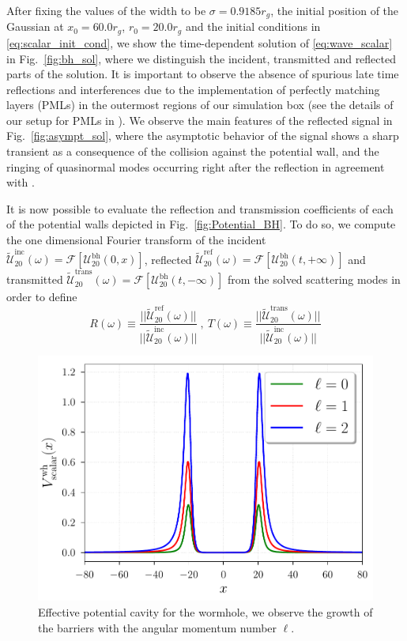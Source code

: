 \documentclass[article,aps,nofootinbib,twocolumn,superscriptaddress]{revtex4-1}
\begin{document}
After fixing the values of the width to be $\sigma=0.9185r_g$, the initial position of the Gaussian at $x_0=60.0r_g$, $r_0=20.0r_g$ and the initial conditions in \eqref{eq:scalar_init_cond}, we show the time-dependent solution of \eqref{eq:wave_scalar} in Fig.~\ref{fig:bh_sol}, where we distinguish the incident, transmitted and reflected parts of the solution. It is important to observe the absence of spurious late time reflections and interferences due to the implementation of perfectly matching layers (PMLs) in the outermost regions of our simulation box (see the details of our setup for PMLs in \citep{Frolov:2017asg}). We observe the main features of the reflected signal in Fig.~\ref{fig:asympt_sol}, where the asymptotic behavior of the signal shows a sharp transient as a consequence of the collision against the potential wall, and the ringing of quasinormal modes occurring right after the reflection in agreement with \citep{Petrich:1985csm}. 

It is now possible to evaluate the reflection and transmission coefficients of each of the potential walls depicted in Fig.~\ref{fig:Potential_BH}. To do so, we compute the one dimensional Fourier transform of the incident $\tilde{\mathcal{U}}_{20}^{\mathrm{inc}}(\omega)=\mathcal{F}[\mathcal{U}^{\mathrm{bh}}_{20}(0,x)]$, reflected $\tilde{\mathcal{U}}_{20}^{\mathrm{ref}}(\omega)=\mathcal{F}[\mathcal{U}^{\mathrm{bh}}_{20}(t,+\infty)]$ and transmitted $\tilde{\mathcal{U}}_{20}^{\mathrm{trans}}(\omega)=\mathcal{F}[\mathcal{U}^{\mathrm{bh}}_{20}(t,-\infty)]$ from the solved scattering modes in order to define
\begin{equation}
R(\omega)\equiv \frac{||\tilde{\mathcal{U}}_{20}^{\mathrm{ref}}(\omega)||}{||\tilde{\mathcal{U}}_{20}^{\mathrm{inc}}(\omega)||}~,~T(\omega)\equiv \frac{||\tilde{\mathcal{U}}_{20}^{\mathrm{trans}}(\omega)||}{||\tilde{\mathcal{U}}_{20}^{\mathrm{inc}}(\omega)||}
\label{eq:ref_and_trans}
\end{equation}
\begin{figure}[t]
\centering
\includegraphics[width=.4\textwidth]{figures/potential_scalar.pdf}
\caption{\label{fig:potential_wh} Effective potential cavity for the wormhole, we observe the growth of the barriers with the angular momentum number $\ell$.}
\end{figure}
\end{document}
